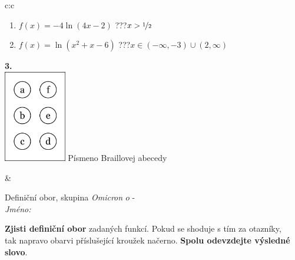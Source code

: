 \documentclass[10pt]{report}
\newcommand\omicron{o}
\begin{document}
\begin{tabular}{c:c}
\begin{minipage}[c][104.5mm][t]{0.5\linewidth}
\begin{center}
\begin{minipage}{0.79\linewidth}
\begin{center}
\begin{varwidth}{\linewidth}
\begin{enumerate}
\item $f(x)=-4\ln{(4x-2)}$\quad \dotfill\; ???\;\dotfill \quad $x>\nicefrac{1}{2}$
\item $f(x)=\ln{(x^2+x-6)}$\quad \dotfill\; ???\;\dotfill \quad $x\in(-\infty , -3)\cup(2 , \infty)$
\end{enumerate}
\end{varwidth}
\end{center}
\end{minipage}
\begin{minipage}{0.20\linewidth}
\begin{center}
{\Huge\bfseries 3.} \\[2mm]
\includegraphics[height=40mm]{../images/braille.png}
{\small Písmeno Braillovej abecedy}
\end{center}
\end{minipage}
\end{center}
\end{minipage}
&
\begin{minipage}[c][104.5mm][t]{0.5\linewidth}
\begin{center}
\vspace{7mm}
{\huge Definiční obor, skupina \textit{Omicron $\omicron$} -}\\[5mm]
\textit{Jméno:}\phantom{xxxxxxxxxxxxxxxxxxxxxxxxxxxxxxxxxxxxxxxxxxxxxxxxxxxxxxxxxxxxxxxxx}\\[5mm]
\begin{minipage}{0.95\linewidth}
\begin{center}
\textbf{Zjisti definiční obor} zadaných funkcí. Pokud se shoduje s tím za otazníky,\\tak napravo obarvi příslušející kroužek načerno. \textbf{Spolu odevzdejte výsledné slovo}.
\end{center}
\end{minipage}
\\[1mm]
\begin{minipage}{0.79\linewidth}
\begin{center}
\begin{varwidth}{\linewidth}
\begin{enumerate}

\end{enumerate}
\end{varwidth}
\end{center}
\end{minipage}
\end{center}
\end{minipage}
\end{tabular}
\end{document}
